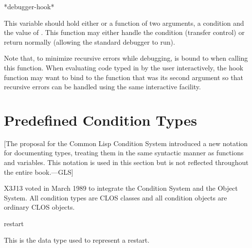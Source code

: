 \begin{defun}[Variable]
*debugger-hook*

  This variable should hold either  or a function of two arguments, a
  condition and the value of . This function may either
  handle the condition (transfer control) or return normally (allowing the
  standard debugger to run).

  Note that, to minimize recursive errors while debugging,  is
  bound to  when calling this function. When evaluating code typed in
  by the user interactively, the hook function may want to bind
   to the function that was its second argument so that
  recursive errors can be handled using the same interactive facility.
\end{defun}



\section{Predefined Condition Types}        
\label{PREDEFINED-CONDITIONS-SECTION}
[The proposal for the Common Lisp Condition System introduced
a new notation for documenting types, treating them in the
same syntactic manner as functions and variables.  This notation
is used in this section but is not reflected
throughout the entire book.---GLS]


X3J13 voted in March 1989  to integrate
the Condition System and the Object System.  All condition types
are CLOS classes and all condition objects are ordinary CLOS objects.

\begin{defun}[Type]
restart

  This is the data type used to represent a restart.
\end{defun}

